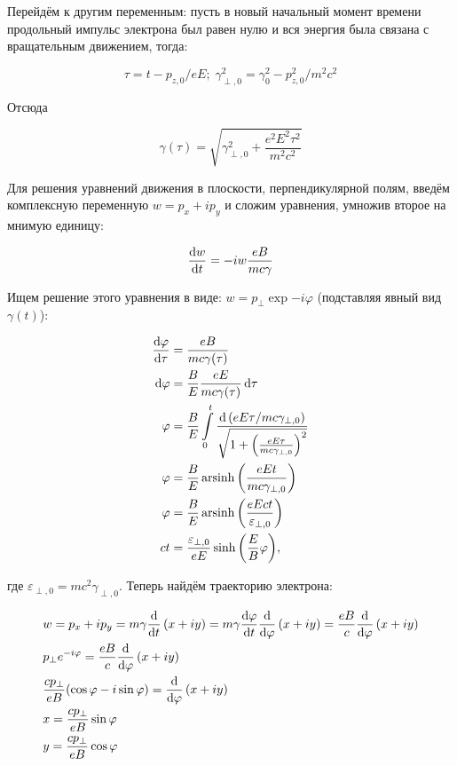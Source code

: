 \documentclass[10pt, a4paper]{article}
\DeclareMathOperator{\arsinh}{arsinh}
\begin{document}
Перейдём к другим переменным: пусть в новый начальный момент времени продольный импульс электрона был равен нулю и вся энергия была связана с вращательным движением, тогда:

\begin{equation*}
	\tau = t - p_{z, 0}/eE;\;\gamma_{\perp,0}^2 = \gamma_0^2 - p_{z, 0}^2/m^2c^2
\end{equation*}

Отсюда

\begin{equation*}
	\gamma(\tau) = \sqrt{\gamma_{\perp, 0}^2 + \frac{e^2E^2\tau^2}{m^2c^2} }
\end{equation*}

Для решения уравнений движения в плоскости, перпендикулярной полям, введём комплексную переменную $w = p_x + i p_y$ и сложим уравнения, умножив второе на мнимую единицу:

\begin{equation*}
	\dv{w}{t} = -i w \frac{eB}{mc\gamma}
\end{equation*}

Ищем решение этого уравнения в виде: $w = p_\perp\exp{-i\varphi}$ (подставляя явный вид $\gamma(t)$):

\begin{align*}
	\dv{\varphi}{\tau} &= \frac{eB}{mc\gamma(\tau)} \\
	\dd{\varphi} &= \frac{B}{E}\frac{eE}{mc\gamma(\tau)}\dd{\tau} \\
	\varphi &= \frac{B}{E}\int\limits_0^{t}\frac{\dd \left(eE\tau / mc\gamma_{\perp, 0}\right)}{\sqrt{1 + \left( \frac{eE\tau}{mc\gamma_{\perp, 0}} \right)^2}} \\
	\varphi &= \frac{B}{E}\arsinh\left( \frac{eEt}{mc\gamma_{\perp, 0}}\right) \\
	\varphi &= \frac{B}{E}\arsinh\left( \frac{eEct}{\varepsilon_{\perp, 0}}\right) \\
	ct &= \frac{\varepsilon_{\perp, 0}}{eE}\sinh{\left( \frac{E}{B}\varphi \right)},
\end{align*}

где $\varepsilon_{\perp, 0}=mc^2\gamma_{\perp, 0}$. Теперь найдём траекторию электрона:

\begin{align*}
	&w = p_x + ip_y = m\gamma \dv{}{t}\left( x + iy \right) = m\gamma\dv{\varphi}{t}\dv{}{\varphi}\left( x + iy \right) = \frac{eB}{c}\dv{}{\varphi}\left( x + iy \right)\\
	&p_\perp e^{-i\varphi} = \frac{eB}{c}\dv{}{\varphi}\left( x + iy \right) \\
	&\frac{cp_\perp}{eB} (\cos\varphi-i\sin\varphi) = \dv{}{\varphi}\left( x + iy \right) \\
	&x = \frac{cp_\perp}{eB}\sin\varphi\\
	&y = \frac{cp_\perp}{eB}\cos\varphi\\
\end{align*}
\end{document}
